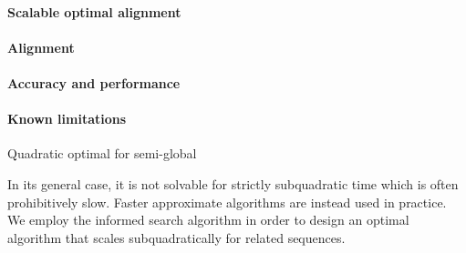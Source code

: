 \label{TRIEsec:task}

\paragraph{Scalable optimal alignment}

\paragraph{Alignment}

\paragraph{Accuracy and performance}

\paragraph{Known limitations}

Quadratic optimal for semi-global

In its general case, it is not solvable for strictly subquadratic time which is
often prohibitively slow. Faster approximate algorithms are instead used in
practice. We employ the \A informed search algorithm in order to design an
optimal algorithm that scales subquadratically for related sequences.